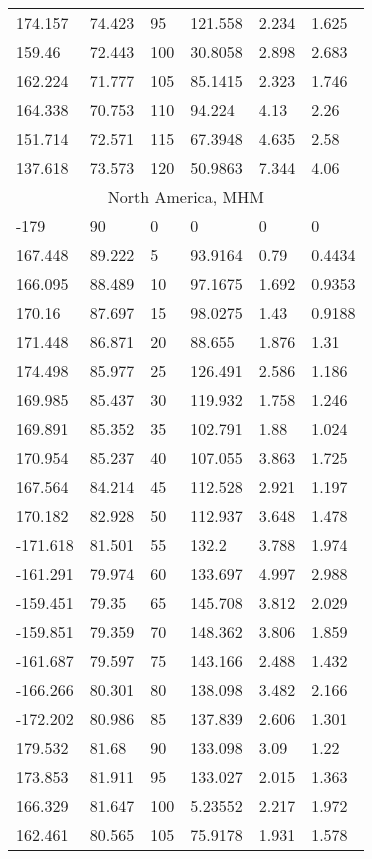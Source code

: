 \begin{longtable}[c]{@{}llllll@{}}
174.157 & 74.423 & 95 & 121.558 & 2.234 & 1.625 \\
159.46 & 72.443 & 100 & 30.8058 & 2.898 & 2.683 \\
162.224 & 71.777 & 105 & 85.1415 & 2.323 & 1.746 \\
164.338 & 70.753 & 110 & 94.224 & 4.13 & 2.26 \\
151.714 & 72.571 & 115 & 67.3948 & 4.635 & 2.58 \\
137.618 & 73.573 & 120 & 50.9863 & 7.344 & 4.06 \\
\multicolumn{6}{c}{North America, MHM} \\
-179 & 90 & 0 & 0 & 0 & 0 \\
167.448 & 89.222 & 5 & 93.9164 & 0.79 & 0.4434 \\
166.095 & 88.489 & 10 & 97.1675 & 1.692 & 0.9353 \\
170.16 & 87.697 & 15 & 98.0275 & 1.43 & 0.9188 \\
171.448 & 86.871 & 20 & 88.655 & 1.876 & 1.31 \\
174.498 & 85.977 & 25 & 126.491 & 2.586 & 1.186 \\
169.985 & 85.437 & 30 & 119.932 & 1.758 & 1.246 \\
169.891 & 85.352 & 35 & 102.791 & 1.88 & 1.024 \\
170.954 & 85.237 & 40 & 107.055 & 3.863 & 1.725 \\
167.564 & 84.214 & 45 & 112.528 & 2.921 & 1.197 \\
170.182 & 82.928 & 50 & 112.937 & 3.648 & 1.478 \\
-171.618 & 81.501 & 55 & 132.2 & 3.788 & 1.974 \\
-161.291 & 79.974 & 60 & 133.697 & 4.997 & 2.988 \\
-159.451 & 79.35 & 65 & 145.708 & 3.812 & 2.029 \\
-159.851 & 79.359 & 70 & 148.362 & 3.806 & 1.859 \\
-161.687 & 79.597 & 75 & 143.166 & 2.488 & 1.432 \\
-166.266 & 80.301 & 80 & 138.098 & 3.482 & 2.166 \\
-172.202 & 80.986 & 85 & 137.839 & 2.606 & 1.301 \\
179.532 & 81.68 & 90 & 133.098 & 3.09 & 1.22 \\
173.853 & 81.911 & 95 & 133.027 & 2.015 & 1.363 \\
166.329 & 81.647 & 100 & 5.23552 & 2.217 & 1.972 \\
162.461 & 80.565 & 105 & 75.9178 & 1.931 & 1.578 \\

\end{longtable}
